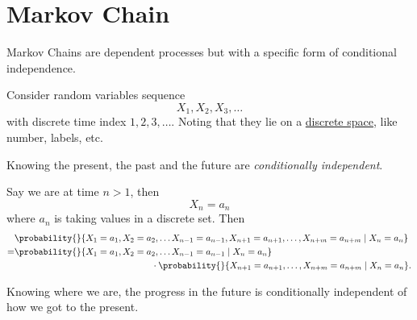 \section{Markov Chain}
Markov Chains are dependent processes but with a specific form of conditional independence.

Consider random variables sequence
\[
	X_1, X_2, X_3, \ldots
\]
with discrete time index \(1, 2, 3, \ldots \). Noting that they lie on a \underline{discrete space}, like number, labels, etc.

\begin{note}
	Knowing the present, the past and the future are \emph{conditionally independent}.
\end{note}

Say we are at time \(n>1\), then
\[
	X_n = a_n
\]
where \(a_n\) is taking values in a discrete set. Then
\[
	\begin{split}
		&\probability{}{X_1 = a_1, X_2 = a_2,  \ldots X_{n-1} = a_{n-1}, X_{n+1} = a_{n+1},\ldots , X_{n+m} = a_{n+m}  \mid X_n = a_n }\\
		=&\probability{}{X_1 = a_1, X_2 = a_2,  \ldots X_{n-1} = a_{n-1}\mid X_n = a_n }\\
		&\qquad\qquad\qquad\qquad\qquad\qquad\qquad\quad\cdot \probability{}{X_{n+1} = a_{n+1},\ldots , X_{n+m} = a_{n+m}  \mid X_n = a_n}.
	\end{split}
\]

\begin{intuition}
	Knowing where we are, the progress in the future is conditionally independent of how we got to the present.
\end{intuition}

